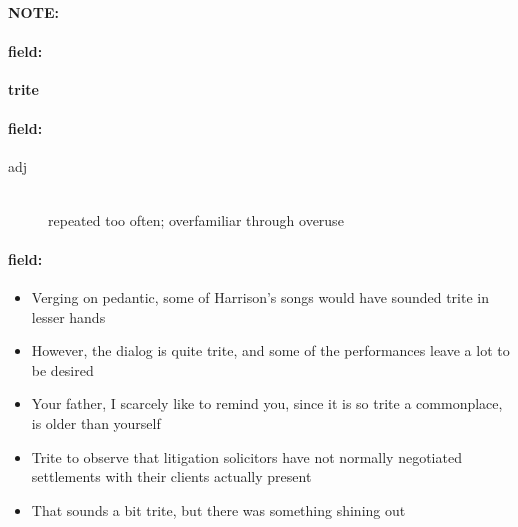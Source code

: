 \documentclass[12pt]{article}
\newenvironment{note}{\paragraph{NOTE:}}{}
\newenvironment{field}{\paragraph{field:}}{}
\begin{document}
\begin{note}
\begin{field}
\textbf{\large trite}
\end{field}


\begin{field}
\begin{description}
\item[adj] \hfill \\ 
repeated too often; overfamiliar through overuse

\end{description}
\end{field}

\begin{field}
\begin{itemize}
\item Verging on pedantic, some of Harrison's songs would have sounded trite in lesser hands
\item However, the dialog is quite trite, and some of the performances leave a lot to be desired
\item Your father, I scarcely like to remind you, since it is so trite a commonplace, is older than yourself
\item Trite to observe that litigation solicitors have not normally negotiated settlements with their clients actually present
\item That sounds a bit trite, but there was something shining out
\end{itemize}
\end{field}
\end{note}
\end{document}
